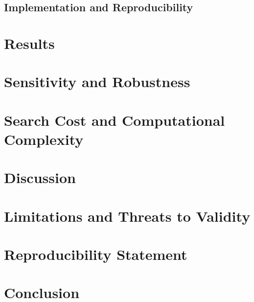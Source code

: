 \documentclass[11pt]{article}
\begin{document}
\subsection{Implementation and Reproducibility}

\section{Results}

\section{Sensitivity and Robustness}

\section{Search Cost and Computational Complexity}

\section{Discussion}

\section{Limitations and Threats to Validity}

\section{Reproducibility Statement}

\section{Conclusion}



\end{document}
